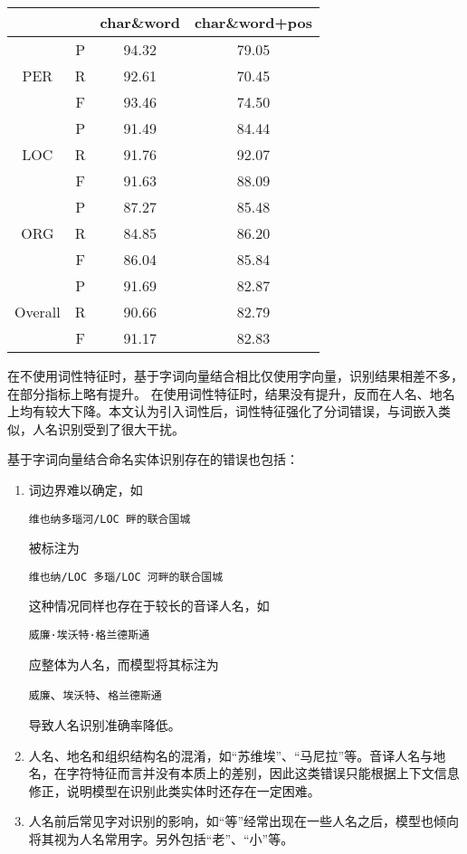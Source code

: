 \begin{table}[H]
    \centering
    \begin{tabular}{cccc}
        \toprule
        && char\&word & char\&word+pos\\
        \midrule
        \multirow{3}{*}{PER} & P & 94.32 & 79.05\\
        & R & 92.61 & 70.45\\
        & F & 93.46 & 74.50 \\
        \midrule
        \multirow{3}{*}{LOC} & P & 91.49 & 84.44\\
        & R & 91.76 & 92.07 \\
        & F & 91.63 & 88.09\\
        \midrule
        \multirow{3}{*}{ORG} & P & 87.27 & 85.48\\
        & R & 84.85 & 86.20\\
        & F & 86.04 & 85.84\\
        \midrule
        \multirow{3}{*}{Overall} & P & 91.69 & 82.87\\
        & R & 90.66 & 82.79\\
        & F & 91.17  & 82.83\\
        \bottomrule
    \end{tabular}
    \label{tab:word_char_comparison}
\end{table}
在不使用词性特征时，基于字词向量结合相比仅使用字向量，识别结果相差不多，在部分指标上略有提升。
在使用词性特征时，结果没有提升，反而在人名、地名上均有较大下降。本文认为引入词性后，词性特征强化了分词错误，与词嵌入类似，人名识别受到了很大干扰。

基于字词向量结合命名实体识别存在的错误也包括：
\begin{enumerate}[\indent(1)]
    \item 词边界难以确定，如
        \begin{center}
            \verb|维也纳多瑙河/LOC 畔的联合国城|
        \end{center}
        被标注为
        \begin{center}
            \verb|维也纳/LOC 多瑙/LOC 河畔的联合国城|
        \end{center}
        这种情况同样也存在于较长的音译人名，如
        \begin{center}
            \verb|威廉·埃沃特·格兰德斯通|
        \end{center}
        应整体为人名，而模型将其标注为
        \begin{center}
            \verb|威廉|、\verb|埃沃特|、\verb|格兰德斯通|
        \end{center}
        导致人名识别准确率降低。
    \item 人名、地名和组织结构名的混淆，如“苏维埃”、“马尼拉”等。音译人名与地名，在字符特征而言并没有本质上的差别，因此这类错误只能根据上下文信息修正，说明模型在识别此类实体时还存在一定困难。
    \item 人名前后常见字对识别的影响，如“等”经常出现在一些人名之后，模型也倾向将其视为人名常用字。另外包括“老”、“小”等。
\end{enumerate}

